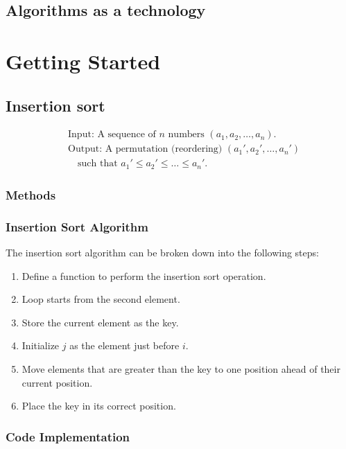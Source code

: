 \documentclass{book}
\begin{document}
\section{Algorithms as a technology}





\chapter{Getting Started}
\section{Insertion sort}
    \begin{align*}
        &\text{Input: A sequence of } n \text{ numbers } (a_1, a_2, \ldots, a_n). \\
        &\text{Output: A permutation (reordering) } (a_1', a_2', \ldots, a_n') \\
        &\quad \text{such that } a_1' \leq a_2' \leq \ldots \leq a_n'.
    \end{align*}
\subsection*{Methods}
\subsection{Insertion Sort Algorithm}

The insertion sort algorithm can be broken down into the following steps:

\begin{enumerate}
    \item Define a function to perform the insertion sort operation.
    \item Loop starts from the second element.
    \item Store the current element as the key.
    \item Initialize \( j \) as the element just before \( i \).
    \item Move elements that are greater than the key to one position ahead of their current position.
    \item Place the key in its correct position.
\end{enumerate}

\subsection{Code Implementation}
\end{document}

